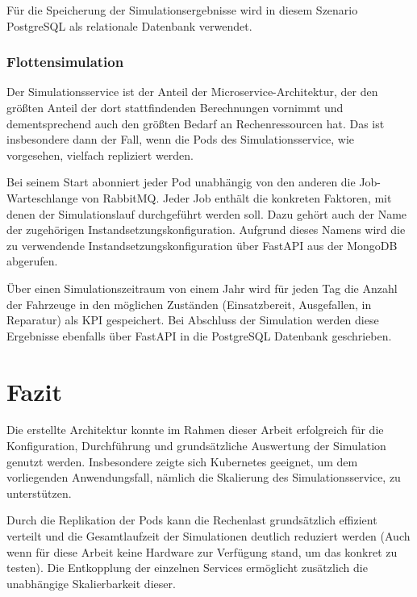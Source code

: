 \documentclass[11pt,a4paper]{article}
\begin{document}
Für die Speicherung der Simulationsergebnisse wird in diesem Szenario PostgreSQL als relationale Datenbank verwendet.

\subsubsection{Flottensimulation}
\label{sec:Flottensimulation}
Der Simulationsservice ist der Anteil der Microservice-Architektur, der den größten Anteil
der dort stattfindenden Berechnungen vornimmt und dementsprechend auch den größten Bedarf
an Rechenressourcen hat. Das ist insbesondere dann der Fall, wenn die Pods des Simulationsservice,
wie vorgesehen, vielfach repliziert werden.

Bei seinem Start abonniert jeder Pod unabhängig von den anderen die Job-Warteschlange von RabbitMQ.
Jeder Job enthält die konkreten Faktoren, mit denen der Simulationslauf durchgeführt werden soll.
Dazu gehört auch der Name der zugehörigen Instandsetzungskonfiguration. Aufgrund
dieses Namens wird die zu verwendende Instandsetzungskonfiguration über FastAPI
aus der MongoDB abgerufen.

Über einen Simulationszeitraum von einem Jahr wird für jeden Tag die Anzahl der Fahrzeuge
in den möglichen Zuständen (Einsatzbereit, Ausgefallen, in Reparatur) als KPI gespeichert.
Bei Abschluss der Simulation werden diese Ergebnisse ebenfalls über FastAPI in die 
PostgreSQL Datenbank geschrieben.



% 

\section{Fazit}
Die erstellte Architektur konnte im Rahmen dieser Arbeit erfolgreich für die Konfiguration, Durchführung und grundsätzliche
Auswertung der Simulation genutzt werden. 
Insbesondere zeigte sich Kubernetes geeignet, um dem vorliegenden Anwendungsfall, nämlich die Skalierung des Simulationsservice,
zu unterstützen. 

Durch die Replikation der Pods kann die Rechenlast grundsätzlich effizient verteilt und 
die Gesamtlaufzeit der Simulationen deutlich reduziert werden 
(Auch wenn für diese Arbeit keine Hardware zur Verfügung stand, um das konkret zu testen).
Die Entkopplung der einzelnen Services ermöglicht zusätzlich die unabhängige Skalierbarkeit dieser.
\end{document}
